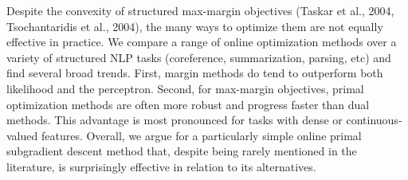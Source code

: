 Despite the convexity of structured max-margin objectives (Taskar et al., 2004, Tsochantaridis et al., 2004), the many ways to optimize them are not equally effective in practice. We compare a range of online optimization methods over a variety of structured NLP tasks (coreference, summarization, parsing, etc) and find several broad trends. First, margin methods do tend to outperform both likelihood and the perceptron. Second, for max-margin objectives, primal optimization methods are often more robust and progress faster than dual methods. This advantage is most pronounced for tasks with dense or continuous-valued features. Overall, we argue for a particularly simple online primal subgradient descent method that, despite being rarely mentioned in the literature, is surprisingly effective in relation to its alternatives.
